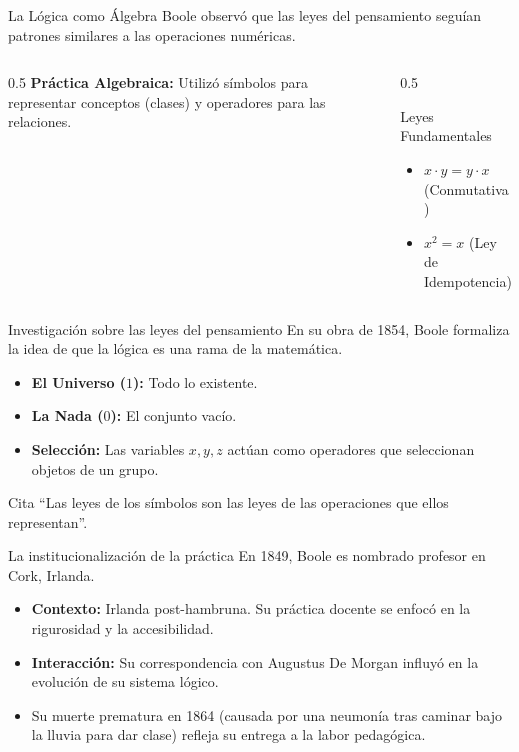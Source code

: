 \documentclass{beamer}
\begin{document}
\begin{frame}{La Lógica como Álgebra}
    Boole observó que las leyes del pensamiento seguían patrones similares a las operaciones numéricas.
    \vspace{0.3cm}
    \begin{columns}
        \begin{column}{0.5\textwidth}
            \textbf{Práctica Algebraica:}
            Utilizó símbolos para representar conceptos (clases) y operadores para las relaciones.
        \end{column}
        \begin{column}{0.5\textwidth}
            \begin{exampleblock}{Leyes Fundamentales}
                \begin{itemize}
                    \item $x \cdot y = y \cdot x$ (Conmutativa)
                    \item $x^2 = x$ (Ley de Idempotencia)
                \end{itemize}
            \end{exampleblock}
        \end{column}
    \end{columns}
\end{frame}

\begin{frame}{Investigación sobre las leyes del pensamiento}
    En su obra de 1854, Boole formaliza la idea de que la lógica es una rama de la matemática.
    \begin{itemize}
        \item \textbf{El Universo ($1$):} Todo lo existente.
        \item \textbf{La Nada ($0$):} El conjunto vacío.
        \item \textbf{Selección:} Las variables $x, y, z$ actúan como operadores que seleccionan objetos de un grupo.
    \end{itemize}
\begin{block}{Cita}
“Las leyes de los símbolos son las leyes de las operaciones que ellos representan”.
\end{block}

\end{frame}

\begin{frame}{La institucionalización de la práctica}
    En 1849, Boole es nombrado profesor en Cork, Irlanda. 
    \begin{itemize}
        \item \textbf{Contexto:} Irlanda post-hambruna. Su práctica docente se enfocó en la rigurosidad y la accesibilidad.
        \item \textbf{Interacción:} Su correspondencia con Augustus De Morgan influyó en la evolución de su sistema lógico.
        \item Su muerte prematura en 1864 (causada por una neumonía tras caminar bajo la lluvia para dar clase) refleja su entrega a la labor pedagógica.
    \end{itemize}
\end{frame}
\end{document}
